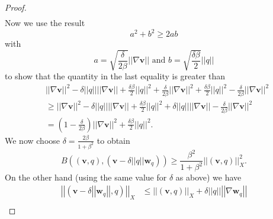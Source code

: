\documentclass[12pt,a4paper]{article}
\theoremstyle{definition}
\begin{document}
\begin{proof}
\begin{equation}
\begin{aligned}
\end{aligned}
\end{equation}
Now we use the result
\begin{equation}
a^2+b^2\geq 2ab \nonumber
\end{equation}
with \begin{equation}\nonumber
a=\sqrt{\frac{\delta}{2\beta}}\left|\left|\nabla\textbf{v}\right|\right|\text{ and } b = \sqrt{\frac{\delta \beta }{2}}\left|\left|q\right|\right|
\end{equation}
to show that the quantity in the last equality is greater than
\begin{equation}
\begin{aligned}\nonumber
&\left|\left|\nabla \textbf{v}\right|\right|^2 -  \delta\left|\left|q\right|\right|\left|\left|\nabla \textbf{v}\right|\right| +\frac{\delta \beta }{2}\left|\left|q\right|\right|^2 + \frac{\delta}{2\beta}\left|\left|\nabla\textbf{v}\right|\right|^2 +\frac{\delta \beta }{2}\left|\left|q\right|\right|^2 - \frac{\delta}{2\beta}\left|\left|\nabla\textbf{v}\right|\right|^2\\
&\geq \left|\left|\nabla \textbf{v}\right|\right|^2 -  \delta\left|\left|q\right|\right|\left|\left|\nabla \textbf{v}\right|\right| +\frac{\delta \beta }{2}\left|\left|q\right|\right|^2 + \delta\left|\left|q\right|\right|\left|\left|\nabla \textbf{v}\right|\right|- \frac{\delta}{2\beta}\left|\left|\nabla\textbf{v}\right|\right|^2\\
&=\left(1-\frac{\delta}{2\beta}\right)\left|\left|\nabla \textbf{v}\right|\right|^2 +\frac{\delta\beta}{2}\left|\left|q\right|\right|^2.
\end{aligned}
\end{equation}
We now choose $\delta=\frac{2\beta}{1+\beta^2}$ to obtain
\begin{equation}\nonumber
B\left(\left(\textbf{v},q\right),\left(\textbf{v}-\delta\left|\left|q\right|\right|\textbf{w}_q\right)\right)\geq \frac{\beta^2}{1+\beta^2}\left|\left|\left(\textbf{v},q\right)\right|\right|_X^2.
\end{equation}
On the other hand (using the same value for $\delta$ as above) we have
\begin{equation}
\begin{aligned}\nonumber
\left|\left|\left(\textbf{v}-\delta\left|\left|\textbf{w}_q\right|\right|,q\right)\right|\right|_X&\leq \left|\left|\left(\textbf{v},q\right)\right|\right|_X+\delta\left|\left|q\right|\right|\left|\left|\nabla \textbf{w}_q\right|\right|\\

\end{aligned}
\end{equation}
\end{proof}
\end{document}

